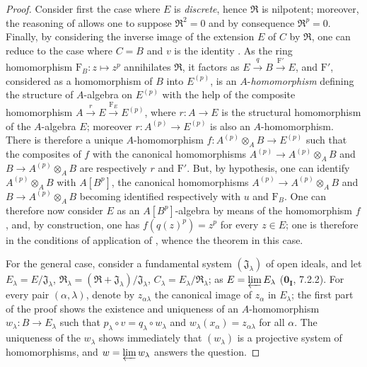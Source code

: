 \begin{proof}
Consider first the case where $E$ is \emph{discrete}, hence $\mathfrak{R}$ is nilpotent; moreover, the reasoning of  allows one to suppose $\mathfrak{R}^2=0$ and by consequence $\mathfrak{R}^p=0$.
Finally, by considering the inverse image of the extension $E$ of $C$ by $\mathfrak{R}$, one can reduce to the case where $C=B$ and $v$ is the identity .
As the ring homomorphism $\mathrm{F}_B:z\mapsto z^p$ annihilates $\mathfrak{R}$, it factors as $E\xrightarrow{q}B\xrightarrow{\mathrm{F}'} E$, and $\mathrm{F}'$, considered as a homomorphism of $B$ into $E^{(p)}$, is an $A$-\emph{homomorphism} defining the structure of $A$-algebra on $E^{(p)}$ with the help of the composite homomorphism $A\xrightarrow{r} E\xrightarrow{\mathrm{F}_E} E^{(p)}$, where $r:A\to E$ is the structural homomorphism of the $A$-algebra $E$; moreover $r:A^{(p)}\to E^{(p)}$ is also an $A$-homomorphism.
There is therefore a unique $A$-homomorphism $f:A^{(p)}\otimes_A B\to E^{(p)}$ such that the composites of $f$ with the canonical homomorphisms $A^{(p)}\to A^{(p)}\otimes_A B$ and $B\to A^{(p)}\otimes_A B$ are respectively $r$ and $\mathrm{F}'$.
But, by hypothesis, one can identify $A^{(p)}\otimes_A B$ with $A[B^p]$, the canonical homomorphisms $A^{(p)}\to A^{(p)}\otimes_A B$ and $B\to A^{(p)}\otimes_A B$ becoming identified respectively with $u$ and $\mathrm{F}_B$.
One can therefore now consider $E$ as an $A[B^p]$-algebra by means of the homomorphism $f$, and, by construction, one has $f(q(z)^p)=z^p$ for every $z\in E$; one is therefore in the conditions of application of , whence the theorem in this case.

For the general case, consider a fundamental system $(\mathfrak{J}_\lambda)$ of open ideals, and let $E_\lambda=E/\mathfrak{J}_\lambda$, $\mathfrak{R}_\lambda=(\mathfrak{R}+\mathfrak{J}_\lambda)/\mathfrak{J}_\lambda$, $C_\lambda=E_\lambda/\mathfrak{R}_\lambda$; as $E=\varprojlim E_\lambda$ ($\mathbf{0_I}$, 7.2.2).
For every pair $(\alpha,\lambda)$, denote by $z_{\alpha\lambda}$ the canonical image of $z_\alpha$ in $E_\lambda$; the first part of the proof shows the existence and uniqueness of an $A$-homomorphism $w_\lambda:B\to E_\lambda$ such that $p_\lambda\circ v=q_\lambda\circ w_\lambda$ and $w_\lambda(x_\alpha)=z_{\alpha\lambda}$ for all $\alpha$.
The uniqueness of the $w_\lambda$ shows immediately that $(w_\lambda)$ is a projective system of homomorphisms, and $w=\varprojlim w_\lambda$ answers the question.
\end{proof}

